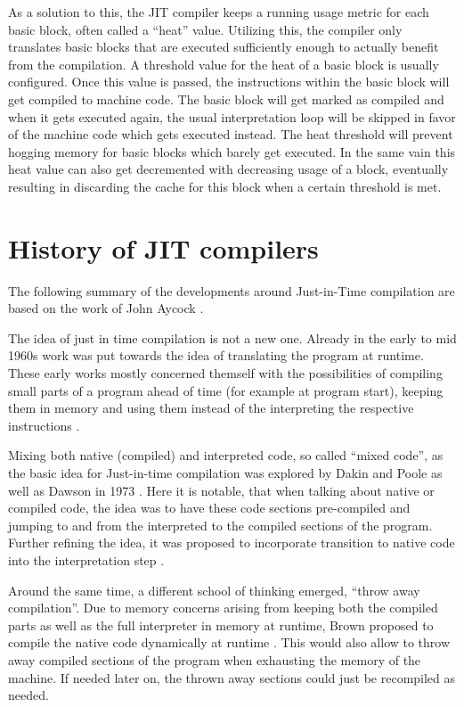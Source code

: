 As a solution to this, the JIT compiler keeps a running usage metric for each basic block, often called a \enquote{heat} value. 
Utilizing this, the compiler only translates basic blocks that are executed sufficiently enough to actually benefit from the compilation. 
A threshold value for the heat of a basic block is usually configured. 
Once this value is passed, the instructions within the basic block will get compiled to machine code.
The basic block will get marked as compiled and when it gets executed again, the usual interpretation loop will be skipped in favor of the machine code which gets executed instead. 
The heat threshold will prevent hogging memory for basic blocks which barely get executed. In the same vain this heat value can also get decremented with decreasing usage of a block, eventually resulting in discarding the cache for this block when a certain threshold is met. 

\section{History of JIT compilers}
The following summary of the developments around Just-in-Time compilation are based on the work of John Aycock \cite{aycock2003}.

The idea of just in time compilation is not a new one.
Already in the early to mid 1960s work was put towards the idea of translating the program at runtime. These early works mostly concerned themself with the possibilities of compiling small parts of a program ahead of time (for example at program start), keeping them in memory and using them instead of the interpreting the respective instructions \cites{mccarthy1960, uom1964}.

Mixing both native (compiled) and interpreted code, so called \enquote{mixed code}, as the basic idea for Just-in-time compilation was explored by Dakin and Poole as well as Dawson in 1973 \cites{Dakin1973, Dawson1973}.
Here it is notable, that when talking about native or compiled code, the idea was to have these code sections pre-compiled and jumping to and from the interpreted to the compiled sections of the program. 
Further refining the idea, it was proposed to incorporate transition to native code into the interpretation step \cite{Pittman1987}.

Around the same time, a different school of thinking emerged, \enquote{throw away compilation}. Due to memory concerns arising from keeping both the compiled parts as well as the full interpreter in memory at runtime, Brown proposed to compile the native code dynamically at runtime \cite{Brown1976}.
This would also allow to throw away compiled sections of the program when exhausting the memory of the machine. If needed later on, the thrown away sections could just be recompiled as needed. 

